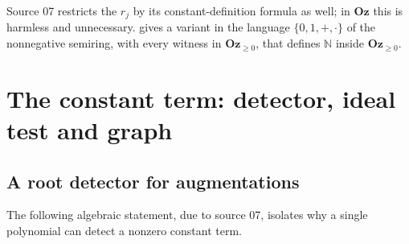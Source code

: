 \documentclass[11pt,oneside]{article}
\numberwithin{equation}{section}
\theoremstyle{definition}
\theoremstyle{remark}
\newcommand{\Oz}{\mathbf{Oz}}
\newcommand{\N}{\mathbb N}
\begin{document}
Source 07 restricts the $r_j$ by its constant-definition formula as well; in
$\Oz$ this is harmless and unnecessary.  gives a
variant in the language $\{0,1,+,\cdot\}$ of the nonnegative semiring, with
every witness in $\Oz_{\ge0}$, that defines $\N$ inside $\Oz_{\ge0}$.

\section{The constant term: detector, ideal test and graph}\label{odg:def:sec:ct}

\subsection{A root detector for augmentations}

The following algebraic statement, due to source 07, isolates why a single
polynomial can detect a nonzero constant term.
\end{document}
